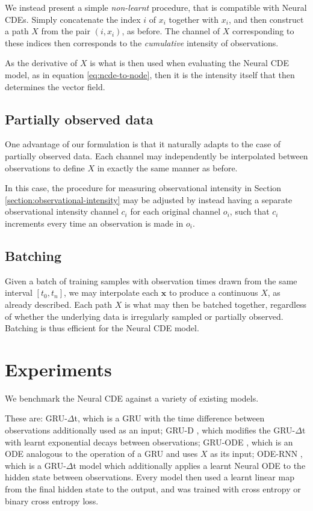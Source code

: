 \documentclass{article}
\theoremstyle{plain}
\theoremstyle{definition}
\begin{document}
	We instead present a simple \emph{non-learnt} procedure, that is compatible with Neural CDEs. Simply concatenate the index $i$ of $x_i$ together with $x_i$, and then construct a path $X$ from the pair $(i, x_i)$, as before. The channel of $X$ corresponding to these indices then corresponds to the \emph{cumulative} intensity of observations.
	
	As the derivative of $X$ is what is then used when evaluating the Neural CDE model, as in equation \eqref{eq:ncde-to-node}, then it is the intensity itself that then determines the vector field.
	
	\subsection{Partially observed data}\label{section:partial}
	One advantage of our formulation is that it naturally adapts to the case of partially observed data. Each channel may independently be interpolated between observations to define $X$ in exactly the same manner as before.
	
	In this case, the procedure for measuring observational intensity in Section \ref{section:observational-intensity} may be adjusted by instead having a separate observational intensity channel $c_i$ for each original channel $o_i$, such that $c_i$ increments every time an observation is made in $o_i$.
	
	\subsection{Batching}
	Given a batch of training samples with observation times drawn from the same interval $[t_0, t_n]$, we may interpolate each $\mathbf{x}$ to produce a continuous $X$, as already described. Each path $X$ is what may then be batched together, regardless of whether the underlying data is irregularly sampled or partially observed. Batching is thus efficient for the Neural CDE model.
	
	\section{Experiments}	
	We benchmark the Neural CDE against a variety of existing models.
	
	These are: GRU-$\Delta$t, which is a GRU with the time difference between observations additionally used as an input; GRU-D \cite{Che2018}, which modifies the GRU-$\Delta$t with learnt exponential decays between observations; GRU-ODE \cite{gru-ode-bayes, gruode}, which is an ODE analogous to the operation of a GRU and uses $X$ as its input; ODE-RNN \cite{latent-odes}, which is a GRU-$\Delta$t model which additionally applies a learnt Neural ODE to the hidden state between observations. Every model then used a learnt linear map from the final hidden state to the output, and was trained with cross entropy or binary cross entropy loss.
	
\end{document}
